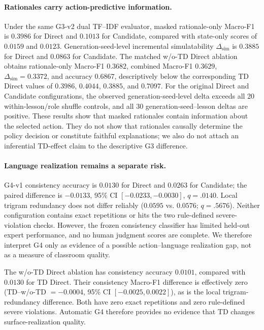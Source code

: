 \documentclass[manuscript,review,anonymous]{acmart}
\begin{document}
 
\paragraph{Rationales carry action-predictive information.}
Under the same G3-v2 dual TF--IDF evaluator, masked rationale-only Macro-F1 is
$0.3986$ for Direct and $0.1013$ for Candidate, compared with state-only
scores of $0.0159$ and $0.0123$. Generation-seed-level incremental simulatability
$\Delta_{\mathrm{sim}}$ is $0.3885$ for Direct and $0.0863$ for Candidate.
The matched w/o-TD Direct ablation obtains rationale-only Macro-F1 $0.3682$,
combined Macro-F1 $0.3629$, $\Delta_{\mathrm{sim}}=0.3372$, and accuracy
$0.6867$, descriptively below the corresponding TD Direct values of $0.3986$,
$0.4044$, $0.3885$, and $0.7097$.
For the original Direct and Candidate configurations, the observed
generation-seed-level delta exceeds all 20 within-lesson/role shuffle controls,
and all 30 generation-seed--lesson deltas are
positive. These results show that masked rationales contain information about
the selected action. They do not show that rationales causally determine the
policy decision or constitute faithful explanations; we also do not attach an
inferential TD-effect claim to the descriptive G3 difference.

\paragraph{Language realization remains a separate risk.}
G4-v1 consistency accuracy is $0.0130$ for Direct and $0.0263$ for Candidate;
the paired difference is $-0.0133$, 95\% CI $[-0.0233,-0.0030]$,
$q=.0140$. Local trigram redundancy does not differ reliably ($0.0595$ vs.
$0.0576$; $q=.5676$). Neither configuration contains exact repetitions or
hits the two rule-defined severe-violation checks. However, the frozen
consistency classifier has limited held-out expert performance, and no human
judgment scores are complete. We therefore interpret G4 only as evidence of a
possible action--language realization gap, not as a measure of classroom
quality.

The w/o-TD Direct ablation has consistency accuracy $0.0101$, compared with
$0.0130$ for TD Direct. Their consistency Macro-F1 difference is effectively
zero (TD--w/o-TD $=-0.0004$, 95\% CI $[-0.0025,0.0022]$), as is the local
trigram-redundancy difference. Both have zero exact repetitions and zero
rule-defined severe violations. Automatic G4 therefore provides no evidence
that TD changes surface-realization quality.
\end{document}

